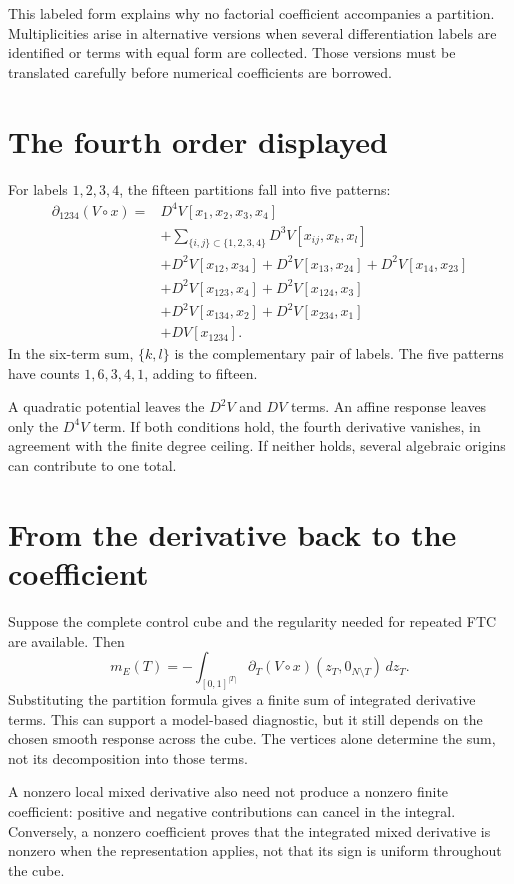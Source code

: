 This labeled form explains why no factorial coefficient accompanies a partition. Multiplicities arise in alternative versions when several differentiation labels are identified or terms with equal form are collected. Those versions must be translated carefully before numerical coefficients are borrowed.

\section{The fourth order displayed}
For labels $1,2,3,4$, the fifteen partitions fall into five patterns:
\begin{align}
 \partial_{1234}(V\circ x)
 ={}&D^4V[x_1,x_2,x_3,x_4]\nonumber\\
 &+\sum_{\{i,j\}\subset\{1,2,3,4\}}
   D^3V[x_{ij},x_k,x_l]\nonumber\\
 &+D^2V[x_{12},x_{34}]+D^2V[x_{13},x_{24}]
   +D^2V[x_{14},x_{23}]\nonumber\\
 &+D^2V[x_{123},x_4]+D^2V[x_{124},x_3]\nonumber\\
 &+D^2V[x_{134},x_2]+D^2V[x_{234},x_1]\nonumber\\
 &+DV[x_{1234}].
\end{align}
In the six-term sum, $\{k,l\}$ is the complementary pair of labels. The five patterns have counts $1,6,3,4,1$, adding to fifteen.

A quadratic potential leaves the $D^2V$ and $DV$ terms. An affine response leaves only the $D^4V$ term. If both conditions hold, the fourth derivative vanishes, in agreement with the finite degree ceiling. If neither holds, several algebraic origins can contribute to one total.

\section{From the derivative back to the coefficient}
Suppose the complete control cube and the regularity needed for repeated FTC are available. Then
\begin{equation}
 m_E(T)=-\int_{[0,1]^{|T|}}\partial_T(V\circ x)(z_T,0_{N\setminus T})\,dz_T.
\end{equation}
Substituting the partition formula gives a finite sum of integrated derivative terms. This can support a model-based diagnostic, but it still depends on the chosen smooth response across the cube. The vertices alone determine the sum, not its decomposition into those terms.

A nonzero local mixed derivative also need not produce a nonzero finite coefficient: positive and negative contributions can cancel in the integral. Conversely, a nonzero coefficient proves that the integrated mixed derivative is nonzero when the representation applies, not that its sign is uniform throughout the cube.

